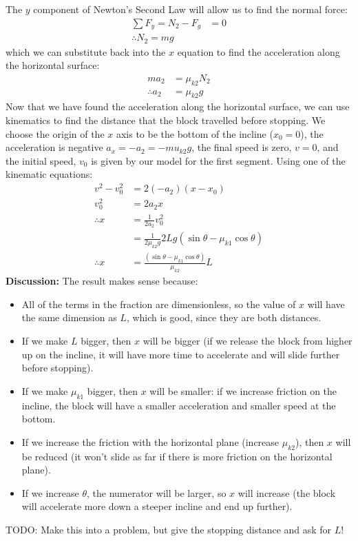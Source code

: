 \begin{example}
The $y$ component of Newton's Second Law will allow us to find the normal force:
\begin{align*}
\sum F_y = N_2 -F_g &=0\\
\therefore N_2 = mg
\end{align*}
which we can substitute back into the $x$ equation to find the acceleration along the horizontal surface:
\begin{align*}
ma_2 &=\mu_{k2}N_2 \\
\therefore a_2&=\mu_{k2}g
\end{align*}
Now that we have found the acceleration along the horizontal surface, we can use kinematics to find the distance that the block travelled before stopping. We choose the origin of the $x$ axis to be the bottom of the incline ($x_0=0$), the acceleration is negative $a_x = -a_2 = -mu_{k2}g$, the final speed is zero, $v=0$, and the initial speed, $v_0$ is given by our model for the first segment. Using one of the kinematic equations:
\begin{align*}
v^2-v_0^2&=2(-a_2)(x-x_0)\\
v_0^2&=2a_2x\\
\therefore x &=\frac{1}{2a_2}v_0^2\\
&=\frac{1}{2\mu_{k2}g}2Lg(\sin\theta-\mu_{k1}\cos\theta)\\
\therefore x&=\frac{(\sin\theta-\mu_{k1}\cos\theta)}{\mu_{k2}}L
\end{align*}
\textbf{Discussion:} The result makes sense because:
\begin{itemize}
\item All of the terms in the fraction are dimensionless, so the value of $x$ will have the same dimension as $L$, which is good, since they are both distances. 
\item If we make $L$ bigger, then $x$ will be bigger (if we release the block from higher up on the incline, it will have more time to accelerate and will slide further before stopping).
\item If we make $\mu_{k1}$ bigger, then $x$ will be smaller: if we increase friction on the incline, the block will have a smaller acceleration and smaller speed at the bottom.
\item If we increase the friction with the horizontal plane (increase $\mu_{k2}$), then $x$ will be reduced (it won't slide as far if there is more friction on the horizontal plane).
\item If we increase $\theta$, the numerator will be larger, so $x$ will increase (the block will accelerate more down a steeper incline and end up further).
\end{itemize} 

TODO: Make this into a problem, but give the stopping distance and ask for $L$!

\end{example}


